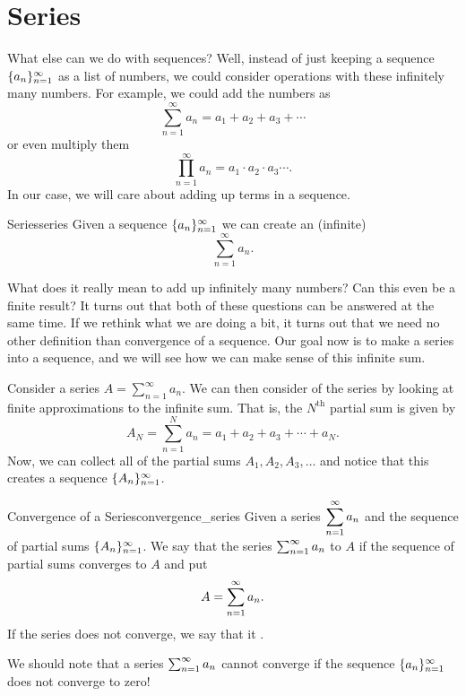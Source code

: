 \section{Series}

What else can we do with sequences? Well, instead of just keeping a sequence $\{a_n\}_{n=1}^\infty$ as a list of numbers, we could consider operations with these infinitely many numbers.  For example, we could add the numbers as
\[
\sum_{n=1}^\infty a_n = a_1 + a_2 + a_3 + \cdots
\]
or even multiply them
\[
\prod_{n=1}^\infty a_n = a_1\cdot a_2 \cdot a_3 \cdots.
\]
In our case, we will care about adding up terms in a sequence.

\begin{df}{Series}{series}
Given a sequence $\{a_n\}_{n=1}^\infty$ we can create an (infinite) 
\[
\sum_{n=1}^\infty a_n.
\]
\end{df}

What does it really mean to add up infinitely many numbers? Can this even be a finite result? It turns out that both of these questions can be answered at the same time.  If we rethink what we are doing a bit, it turns out that we need no other definition than convergence of a sequence.  Our goal now is to make a series into a sequence, and we will see how we can make sense of this infinite sum.

Consider a series $A=\sum_{n=1}^\infty a_n$.  We can then consider  of the series by looking at finite approximations to the infinite sum.  That is, the $N^\textrm{th}$ partial sum is given by
\[
A_N = \sum_{n=1}^N a_n = a_1 + a_2 + a_3 + \cdots + a_N.
\]
Now, we can collect all of the partial sums $A_1,A_2,A_3,\dots$ and notice that this creates a sequence $\{A_n\}_{n=1}^\infty$.

\begin{df}{Convergence of a Series}{convergence_series}
Given a series $\displaystyle{\sum_{n=1}^\infty a_n}$ and the sequence of partial sums $\{A_n\}_{n=1}^\infty$. We say that the series $\sum_{n=1}^\infty a_n$  to $A$ if the sequence of partial sums converges to $A$ and put
\[
A = \sum_{n=1}^\infty a_n.
\]
If the series does not converge, we say that it .
\end{df}

\begin{remark}
We should note that a series $\sum_{n=1}^\infty a_n$ cannot converge if the sequence $\{a_n\}_{n=1}^\infty$ does not converge to zero!
\end{remark}

